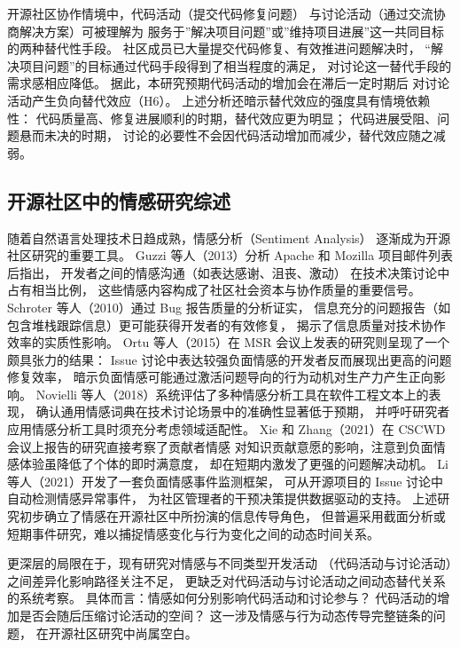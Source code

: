 开源社区协作情境中，代码活动（提交代码修复问题）
与讨论活动（通过交流协商解决方案）可被理解为
服务于”解决项目问题”或”维持项目进展”这一共同目标的两种替代性手段。
社区成员已大量提交代码修复、有效推进问题解决时，
“解决项目问题”的目标通过代码手段得到了相当程度的满足，
对讨论这一替代手段的需求感相应降低。
据此，本研究预期代码活动的增加会在滞后一定时期后
对讨论活动产生负向替代效应（H6）。
上述分析还暗示替代效应的强度具有情境依赖性：
代码质量高、修复进展顺利的时期，替代效应更为明显；
代码进展受阻、问题悬而未决的时期，
讨论的必要性不会因代码活动增加而减少，替代效应随之减弱。

\subsection{开源社区中的情感研究综述}

随着自然语言处理技术日趋成熟，情感分析（Sentiment Analysis）
逐渐成为开源社区研究的重要工具。
Guzzi 等人（2013）分析 Apache 和 Mozilla 项目邮件列表后指出，
开发者之间的情感沟通（如表达感谢、沮丧、激动）
在技术决策讨论中占有相当比例，
这些情感内容构成了社区社会资本与协作质量的重要信号\cite{guzzi2013}。
Schroter 等人（2010）通过 Bug 报告质量的分析证实，
信息充分的问题报告（如包含堆栈跟踪信息）更可能获得开发者的有效修复，
揭示了信息质量对技术协作效率的实质性影响\cite{schroter2010}。
Ortu 等人（2015）在 MSR 会议上发表的研究则呈现了一个颇具张力的结果：
Issue 讨论中表达较强负面情感的开发者反而展现出更高的问题修复效率，
暗示负面情感可能通过激活问题导向的行为动机对生产力产生正向影响\cite{ortu2015bullies}。
Novielli 等人（2018）系统评估了多种情感分析工具在软件工程文本上的表现，
确认通用情感词典在技术讨论场景中的准确性显著低于预期，
并呼吁研究者应用情感分析工具时须充分考虑领域适配性\cite{novielli2018sentiment}。
Xie 和 Zhang（2021）在 CSCWD 会议上报告的研究直接考察了贡献者情感
对知识贡献意愿的影响，注意到负面情感体验虽降低了个体的即时满意度，
却在短期内激发了更强的问题解决动机\cite{xie2021influence}。
Li 等人（2021）开发了一套负面情感事件监测框架，
可从开源项目的 Issue 讨论中自动检测情感异常事件，
为社区管理者的干预决策提供数据驱动的支持\cite{li2021monitoring}。
上述研究初步确立了情感在开源社区中所扮演的信息传导角色，
但普遍采用截面分析或短期事件研究，难以捕捉情感变化与行为变化之间的动态时间关系。

更深层的局限在于，现有研究对情感与不同类型开发活动
（代码活动与讨论活动）之间差异化影响路径关注不足，
更缺乏对代码活动与讨论活动之间动态替代关系的系统考察。
具体而言：情感如何分别影响代码活动和讨论参与？
代码活动的增加是否会随后压缩讨论活动的空间？
这一涉及情感与行为动态传导完整链条的问题，
在开源社区研究中尚属空白。

